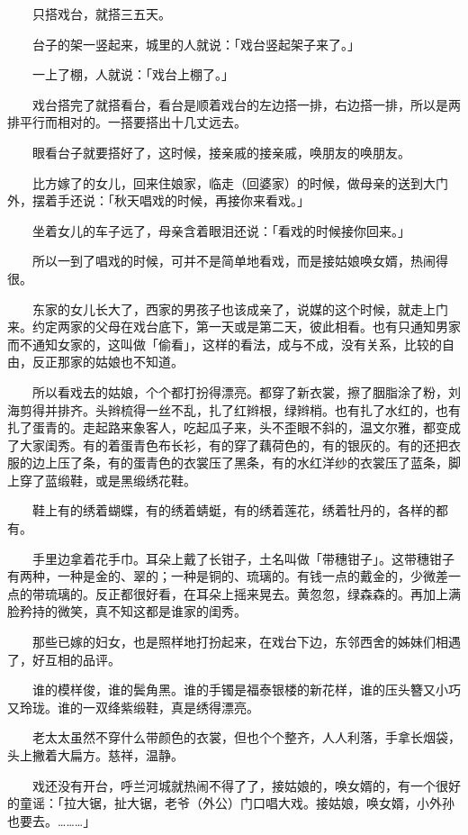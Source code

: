 \documentclass[UTF8]{ctexart}
\begin{document}
　　只搭戏台，就搭三五天。

　　台子的架一竖起来，城里的人就说：「戏台竖起架子来了。」

　　一上了棚，人就说：「戏台上棚了。」

　　戏台搭完了就搭看台，看台是顺着戏台的左边搭一排，右边搭一排，所以是两排平行而相对的。一搭要搭出十几丈远去。

　　眼看台子就要搭好了，这时候，接亲戚的接亲戚，唤朋友的唤朋友。

　　比方嫁了的女儿，回来住娘家，临走（回婆家）的时候，做母亲的送到大门外，摆着手还说：「秋天唱戏的时候，再接你来看戏。」

　　坐着女儿的车子远了，母亲含着眼泪还说：「看戏的时候接你回来。」

　　所以一到了唱戏的时候，可并不是简单地看戏，而是接姑娘唤女婿，热闹得很。

　　东家的女儿长大了，西家的男孩子也该成亲了，说媒的这个时候，就走上门来。约定两家的父母在戏台底下，第一天或是第二天，彼此相看。也有只通知男家而不通知女家的，这叫做「偷看」，这样的看法，成与不成，没有关系，比较的自由，反正那家的姑娘也不知道。

　　所以看戏去的姑娘，个个都打扮得漂亮。都穿了新衣裳，擦了胭脂涂了粉，刘海剪得并排齐。头辫梳得一丝不乱，扎了红辫根，绿辫梢。也有扎了水红的，也有扎了蛋青的。走起路来象客人，吃起瓜子来，头不歪眼不斜的，温文尔雅，都变成了大家闺秀。有的着蛋青色布长衫，有的穿了藕荷色的，有的银灰的。有的还把衣服的边上压了条，有的蛋青色的衣裳压了黑条，有的水红洋纱的衣裳压了蓝条，脚上穿了蓝缎鞋，或是黑缎绣花鞋。

　　鞋上有的绣着蝴蝶，有的绣着蜻蜓，有的绣着莲花，绣着牡丹的，各样的都有。

　　手里边拿着花手巾。耳朵上戴了长钳子，土名叫做「带穗钳子」。这带穗钳子有两种，一种是金的、翠的；一种是铜的、琉璃的。有钱一点的戴金的，少微差一点的带琉璃的。反正都很好看，在耳朵上摇来晃去。黄忽忽，绿森森的。再加上满脸矜持的微笑，真不知这都是谁家的闺秀。

　　那些已嫁的妇女，也是照样地打扮起来，在戏台下边，东邻西舍的姊妹们相遇了，好互相的品评。

　　谁的模样俊，谁的鬓角黑。谁的手镯是福泰银楼的新花样，谁的压头簪又小巧又玲珑。谁的一双绛紫缎鞋，真是绣得漂亮。

　　老太太虽然不穿什么带颜色的衣裳，但也个个整齐，人人利落，手拿长烟袋，头上撇着大扁方。慈祥，温静。

　　戏还没有开台，呼兰河城就热闹不得了了，接姑娘的，唤女婿的，有一个很好的童谣：「拉大锯，扯大锯，老爷（外公）门口唱大戏。接姑娘，唤女婿，小外孙也要去。………」
\end{document}
